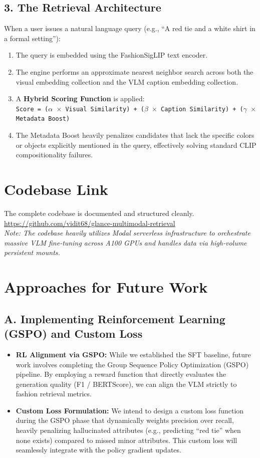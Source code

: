 \documentclass[11pt,a4paper]{article}
\begin{document}
\subsection*{3. The Retrieval Architecture}
When a user issues a natural language query (e.g., ``A red tie and a white shirt in a formal setting''):
\begin{enumerate}
    \item The query is embedded using the FashionSigLIP text encoder.
    \item The engine performs an approximate nearest neighbor search across both the visual embedding collection and the VLM caption embedding collection.
    \item A \textbf{Hybrid Scoring Function} is applied: \\
    \texttt{Score = ($\alpha$ $\times$ Visual Similarity) + ($\beta$ $\times$ Caption Similarity) + ($\gamma$ $\times$ Metadata Boost)}
    \item The Metadata Boost heavily penalizes candidates that lack the specific colors or objects explicitly mentioned in the query, effectively solving standard CLIP compositionality failures.
\end{enumerate}

\section{Codebase Link}
The complete codebase is documented and structured cleanly. \\
\url{https://github.com/vidit68/glance-multimodal-retrieval} \\
\textit{Note: The codebase heavily utilizes Modal serverless infrastructure to orchestrate massive VLM fine-tuning across A100 GPUs and handles data via high-volume persistent mounts.}

\section{Approaches for Future Work}

\subsection*{A. Implementing Reinforcement Learning (GSPO) and Custom Loss}
\begin{itemize}
    \item \textbf{RL Alignment via GSPO:} While we established the SFT baseline, future work involves completing the Group Sequence Policy Optimization (GSPO) pipeline. By employing a reward function that directly evaluates the generation quality (F1 / BERTScore), we can align the VLM strictly to fashion retrieval metrics.
    \item \textbf{Custom Loss Formulation:} We intend to design a custom loss function during the GSPO phase that dynamically weights precision over recall, heavily penalizing hallucinated attributes (e.g., predicting ``red tie'' when none exists) compared to missed minor attributes. This custom loss will seamlessly integrate with the policy gradient updates.
\end{itemize}
\end{document}

